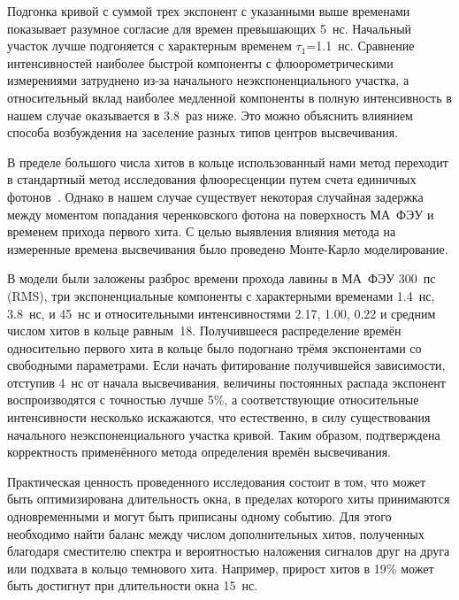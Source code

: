 


Подгонка кривой с  суммой трех экспонент с указанными выше временами показывает разумное согласие для времен превышающих 5~нс. Начальный участок лучше подгоняется с характерным временем $\tau_{1}$=1.1~нс. Сравнение интенсивностей наиболее быстрой компоненты с флюорометрическими измерениями затруднено из-за начального неэкспоненциального участка, а относительный вклад наиболее медленной компоненты в полную интенсивность в нашем случае оказывается в 3.8~раз ниже. Это можно объяснить влиянием способа возбуждения на заселение разных типов центров высвечивания.

В пределе большого числа хитов в кольце использованный нами метод переходит в стандартный метод исследования флюоресценции путем счета единичных фотонов~\cite{SPC}. Однако в нашем случае существует некоторая случайная задержка между моментом попадания черенковского фотона на поверхность МА~ФЭУ и временем прихода первого хита. С целью выявления влияния метода на измеренные времена высвечивания было проведено Монте-Карло моделирование.

В модели были заложены разброс времени прохода лавины в МА~ФЭУ 300~пс (RMS), три экспоненциальные компоненты с характерными временами 1.4~нс, 3.8~нс, и 45~нс и относительными интенсивностями 2.17, 1.00, 0.22 и средним числом хитов в кольце равным~18. Получившееся распределение времён односительно первого хита в кольце было подогнано трёмя экспонентами со свободными параметрами. Если начать фитирование получившейся зависимости, отступив 4~нс от начала высвечивания, величины постоянных распада экспонент воспроизводятся с точностью лучше 5\%, а соответствующие относительные интенсивности несколько искажаются, что естественно, в силу существования начального неэкспоненциального участка кривой. Таким образом, подтверждена корректность применённого метода определения времён высвечивания.

Практическая ценность проведенного исследования состоит в том, что может быть оптимизирована длительность окна, в пределах которого хиты принимаются одновременными и могут быть приписаны одному событию. Для этого необходимо найти баланс между числом дополнительных хитов, полученных благодаря сместителю спектра и вероятностью наложения сигналов друг на друга или подхвата в кольцо темнового хита. Например, прирост хитов в 19\% может быть достигнут при длительности окна 15~нс.


% 
